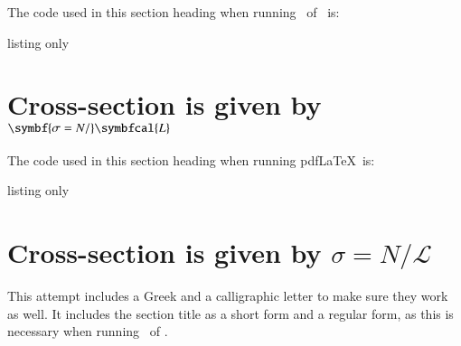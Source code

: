 \label{sec:sig}

The code used in this section heading when running \LuaLaTeX\ of \XeLaTeX\ is:
\begin{tcblisting}{listing only}
\section[Cross-section given by \texorpdfstring{$\sigma = N / \symcal{L}}{sigma = N / L}$]%
  {Cross-section is given by \texorpdfstring{$\symbf{\sigma = N /}\symbfcal{L}$}{sigma = N / L}}%
\end{tcblisting}
The code used in this section heading when running pdf\LaTeX\ is:
\begin{tcblisting}{listing only}
\section[Cross-section given by \texorpdfstring{$\sigma = N / \mathcal{L}$}{sigma = N / L}]%
  {Cross-section is given by \texorpdfstring{$\sigma = N / \mathcal{L}$}{sigma = N / L}}%
\end{tcblisting}

\noindent This attempt includes a Greek and a calligraphic letter to make sure they work as well.
It includes the section title as a short form and a regular form,
as this is necessary when running \LuaLaTeX\ of \XeLaTeX.

